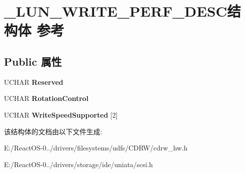 \hypertarget{struct___l_u_n___w_r_i_t_e___p_e_r_f___d_e_s_c}{}\section{\+\_\+\+L\+U\+N\+\_\+\+W\+R\+I\+T\+E\+\_\+\+P\+E\+R\+F\+\_\+\+D\+E\+S\+C结构体 参考}
\label{struct___l_u_n___w_r_i_t_e___p_e_r_f___d_e_s_c}
\subsection*{Public 属性}
\begin{DoxyCompactItemize}
\item 
\mbox{\label{struct___l_u_n___w_r_i_t_e___p_e_r_f___d_e_s_c_a815f0770278c1fe2503fd1ec24973039}} 
U\+C\+H\+AR {\bfseries Reserved}
\item 
\mbox{\label{struct___l_u_n___w_r_i_t_e___p_e_r_f___d_e_s_c_a1eca6f91be2125f63317f81071707cdc}} 
U\+C\+H\+AR {\bfseries Rotation\+Control}
\item 
\mbox{\label{struct___l_u_n___w_r_i_t_e___p_e_r_f___d_e_s_c_a6d12adb101d3095558e4b1d32b6531ae}} 
U\+C\+H\+AR {\bfseries Write\+Speed\+Supported} \mbox{[}2\mbox{]}
\end{DoxyCompactItemize}


该结构体的文档由以下文件生成\+:\begin{DoxyCompactItemize}
\item 
E\+:/\+React\+O\+S-\/0../drivers/filesystems/udfs/\+C\+D\+R\+W/cdrw\+\_\+hw.\+h\item 
E\+:/\+React\+O\+S-\/0../drivers/storage/ide/uniata/scsi.\+h\end{DoxyCompactItemize}
